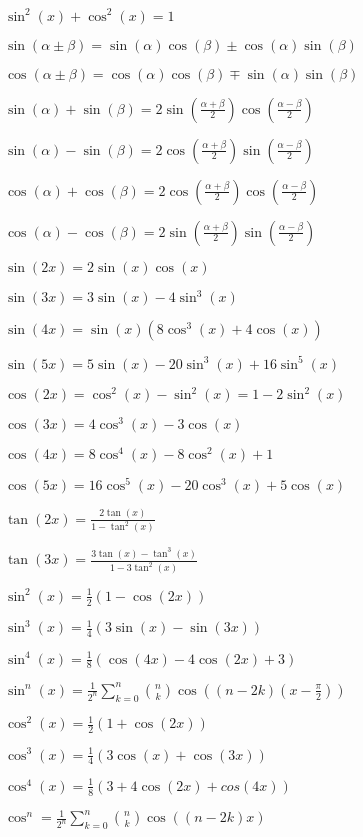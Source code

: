\documentclass[10pt,a4paper]{scrartcl}
\begin{document}
\begin{multicols*}{3}
	$\sin^2(x)+\cos^2(x)=1$	

	 
	
	$\sin(\alpha \pm \beta)=\sin(\alpha)\cos(\beta)\pm \cos(\alpha)\sin(\beta)$
	
	$\cos(\alpha \pm \beta)=\cos(\alpha)\cos(\beta)\mp \sin(\alpha)\sin(\beta)$
	
	 	
	
	$\sin(\alpha)+\sin(\beta) = 2\sin(\frac{\alpha+\beta}{2})\cos(\frac{\alpha-\beta}{2})$
	
	$\sin(\alpha)-\sin(\beta)=2\cos(\frac{\alpha+\beta}{2})\sin(\frac{\alpha-\beta}{2})$
	
	$\cos(\alpha)+\cos(\beta)=2\cos(\frac{\alpha+\beta}{2})\cos(\frac{\alpha-\beta}{2})$
	
	$\cos(\alpha)-\cos(\beta)=2\sin(\frac{\alpha+\beta}{2})\sin(\frac{\alpha-\beta}{2})$
	
	 
	
	$\sin(2x)=2\sin(x)\cos(x)$
	
	$\sin(3x)=3\sin(x)-4\sin^3(x)$
	
	$\sin(4x)=\sin(x)(8\cos^3(x)+4\cos(x))$
	
	$\sin(5x)=5\sin(x)-20\sin^3(x)+16\sin^5(x)$
	
	 
	
	$\cos(2x)=\cos^2(x)-\sin^2(x)=1-2\sin^2(x)$
	
	$\cos(3x)=4\cos^3(x)-3\cos(x)$
	
	$\cos(4x)=8\cos^4(x)-8\cos^2(x)+1$
	
	$\cos(5x)=16\cos^5(x)-20\cos^3(x)+5\cos(x)$
	
	 
	
	$\tan(2x)=\frac{2\tan(x)}{1-\tan^2(x)}$
	
	$\tan(3x)=\frac{3\tan(x)-\tan^3(x)}{1-3\tan^2(x)}$
	
	 
	
	$\sin^2(x)=\frac{1}{2}(1-\cos(2x))$
	
	$\sin^3(x)=\frac{1}{4}(3\sin(x)-\sin(3x))$
	
	$\sin^4(x)=\frac{1}{8}(\cos(4x)-4\cos(2x)+3)$

	$\sin^n(x)=\frac{1}{2^n}\sum_{k=0}^n{{n\choose k} \cos((n-2k)(x-\frac{\pi}{2}))}$
	
	 
	
	$\cos^2(x)=\frac{1}{2}(1+\cos(2x))$
	
	$\cos^3(x)=\frac{1}{4}(3\cos(x)+\cos(3x))$
	
	$\cos^4(x)=\frac{1}{8}(3+4\cos(2x)+cos(4x))$
	
	$\cos^n=\frac{1}{2^n}\sum_{k=0}^n{{n\choose k}  \cos((n-2k)x)}$
	

\end{multicols*}
\end{document}
